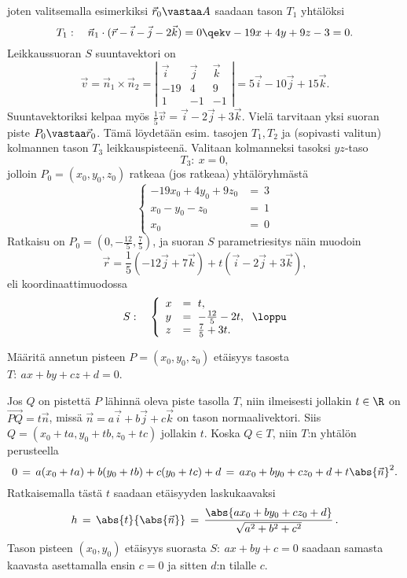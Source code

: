 joten valitsemalla esimerkiksi $\vec r_0 \vastaa A$ saadaan tason $T_1$ yhtälöksi
\[
T_1: \quad \vec n_1 \cdot (\vec r - \vec i - \vec j - 2\vec k) = 0 \qekv -19x+4y+9z-3=0.
\]
Leikkaussuoran $S$ suuntavektori on
\[
\vec v = \vec n_1 \times \vec n_2 =
\left| \begin{array}{ccc}
\vec i & \vec j & \vec k \\
-19 & 4 & 9 \\
1 & -1 & -1 
\end{array} \right| =
5 \vec i - 10 \vec j + 15 \vec k.
\]
Suuntavektoriksi kelpaa myös $\frac{1}{5}\vec v = \vec i - 2 \vec j + 3 \vec k$. Vielä tarvitaan
yksi suoran piste $P_0 \vastaa \vec r_0$. Tämä löydetään esim. tasojen $T_1, T_2$ ja (sopivasti
valitun) kolmannen tason $T_3$ leikkauspisteenä. Valitaan kolmanneksi tasoksi $yz$-taso
\[
T_3: \ x=0,
\]
jolloin $P_0=(x_0,y_0,z_0)$ ratkeaa (jos ratkeaa) yhtälöryhmästä
\[
\left\{ \begin{array}{ll}
-19x_0+4y_0+9z_0 &= \ 3 \\
x_0-y_0-z_0 &= \ 1 \\
x_0 &= \ 0
\end{array} \right.
\]
Ratkaisu on $P_0=(0,-\frac{12}{5},\frac{7}{5})$, ja suoran $S$ parametriesitys näin muodoin 
\[
\vec r = \frac{1}{5}(-12 \vec j + 7 \vec k) + t(\vec i - 2 \vec j + 3 \vec k),
\]
eli koordinaattimuodossa
\[
S: \quad \left\{ \begin{array}{ll}
x &= \ t, \\
y &= \ -\frac{12}{5}-2t, \\
z &= \ \frac{7}{5} + 3t.
\end{array} \right. \loppu
\]
\begin{Exa} \label{pisteen etäisyys tasosta} Määritä annetun pisteen $P=(x_0,y_0,z_0)$ etäisyys
tasosta \newline $T:\ ax+by+cz+d=0$.
\end{Exa}
\ratk Jos $Q$ on pistettä $P$ lähinnä oleva piste tasolla $T$, niin ilmeisesti jollakin $t\in\R$
on $\overrightarrow{PQ}=t\vec n$, missä $\vec n=a\vec i+b\vec j+c\vec k$ on tason 
normaalivektori. Siis $Q=(x_0+ta,y_0+tb,z_0+tc)$ jollakin $t$. Koska $Q \in T$, niin $T$:n
yhtälön perusteella
\[
0\,=\,a(x_0+ta)+b(y_0+tb)+c(y_0+tc)+d\,=\,ax_0+by_0+cz_0+d+t\abs{\vec n}^2.
\]
Ratkaisemalla tästä $t$ saadaan etäisyyden laskukaavaksi
\[
h\,=\,\abs{t}{\abs{\vec n}}\,=\,\frac{\abs{ax_0+by_0+cz_0+d}}{\sqrt{a^2+b^2+c^2}}\,.
\]
Tason pisteen $(x_0,y_0)$ etäisyys suorasta $S:\ ax+by+c=0$ saadaan samasta kaavasta 
asettamalla ensin $c=0$ ja sitten $d$:n tilalle $c$. \loppu

